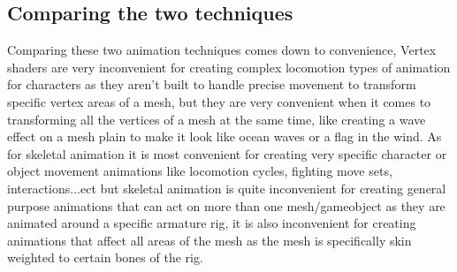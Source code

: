 \documentclass{scrartcl}
\begin{document}
\subsection{Comparing the two techniques}
Comparing these two animation techniques comes down to convenience, Vertex shaders are very inconvenient for creating complex locomotion types of animation for characters as they aren't built to handle precise movement to transform specific vertex areas of a mesh, but they are very convenient when it comes to transforming all the vertices of a mesh at the same time, like creating a wave effect on a mesh plain to make it look like ocean waves or a flag in the wind. As for skeletal animation it is most convenient for creating very specific character or object movement animations like locomotion cycles, fighting move sets, interactions...ect but skeletal animation is quite inconvenient for creating general purpose animations that can act on more than one mesh/gameobject as they are animated around a specific armature rig, it is also inconvenient for creating animations that affect all areas of the mesh as the mesh is specifically skin weighted to certain bones of the rig.



\end{document}
